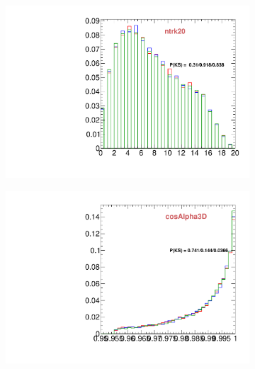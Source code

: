 \begin{figure}
        \centering
        \begin{subfigure}[b]{0.2\textwidth}
                \centering
                \includegraphics[width=\textwidth]{Figures/VariablesComparison/Data_endcaps_figs_3h/ntrk20}
                \label{fig:Data_endcaps_ntrk20_3h}
        \end{subfigure}
        \begin{subfigure}[b]{0.2\textwidth}
                \centering
                \includegraphics[width=\textwidth]{Figures/VariablesComparison/Data_endcaps_figs_3h/cosAlpha3D}
                \label{fig:Data_endcaps_cosAlpha3D_3h}
        \end{subfigure}
        \begin{subfigure}[b]{0.2\textwidth}

\end{subfigure}
\end{figure}
